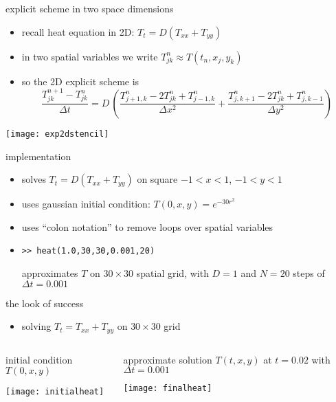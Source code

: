 \begin{frame}{explicit scheme in two space dimensions}

\begin{itemize}
\item recall heat equation in 2D: $T_t = D(T_{xx} + T_{yy})$
\item in two spatial variables we write $T_{jk}^n \approx T(t_n,x_j,y_k)$
\item so the 2D explicit scheme is
\small
	$$\frac{T_{jk}^{n+1} - T_{jk}^n}{\Delta t} = D\,\left(\frac{T_{j+1,k}^n - 2 T_{jk}^n + T_{j-1,k}^n}{\Delta x^2} + \frac{T_{j,k+1}^n - 2 T_{jk}^n + T_{j,k-1}^n}{\Delta y^2}\right)$$
\end{itemize}

\bigskip
\begin{center}
\texttt{[image: exp2dstencil]}
\end{center}
\end{frame}


\begin{frame}{implementation}
\label{slide:heatmatlab}


\small
\begin{itemize}
\item solves $T_t = D(T_{xx} + T_{yy})$ on square $-1 < x < 1$, $-1 < y < 1$
\item uses gaussian initial condition: $T(0,x,y) = e^{-30 r^2}$
\item uses ``colon notation'' to remove loops over spatial variables
\item \texttt{>>  heat(1.0,30,30,0.001,20)}

approximates $T$ on $30\times 30$ spatial grid, with $D=1$ and $N=20$ steps of $\Delta t = 0.001$
\end{itemize}
\end{frame}


\begin{frame}{the look of success}

\begin{itemize}
\item solving $T_t = T_{xx} + T_{yy}$ on $30\times 30$ grid
\end{itemize}

\bigskip
\begin{columns}
\begin{column}{0.5\textwidth}
initial condition $T(0,x,y)$

\phantom{foo}

\bigskip
\begin{center}
\texttt{[image: initialheat]}
\end{center}
\end{column}
\begin{column}{0.5\textwidth}
approximate solution $T(t,x,y)$ at $t=0.02$ with $\Delta t=0.001$ 

\bigskip
\begin{center}
\texttt{[image: finalheat]}
\end{center}
\end{column}
\end{columns}
\end{frame}


